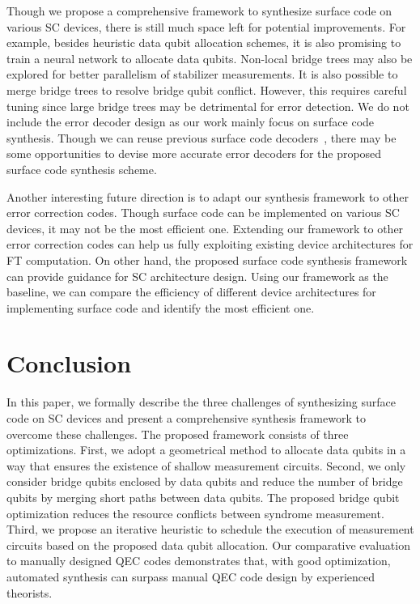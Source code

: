 Though we propose a comprehensive framework to synthesize surface code on various SC devices, there is still much space left for potential improvements. 
For example, besides heuristic data qubit allocation schemes, it is also promising to train a neural network to allocate data qubits.
Non-local bridge trees may also be explored for better parallelism of stabilizer measurements. 
It is also possible to merge bridge trees to resolve bridge qubit conflict. However, this requires careful tuning since large bridge trees may be detrimental for error detection.
We do not include the error decoder design as our work mainly focus on surface code synthesis. Though we can reuse previous surface code decoders~\cite{Chamberland2020TopologicalAS, Varsamopoulos2017DecodingSS, Krastanov2017DeepNN, Baireuther2017MachinelearningassistedCO}, there may be some opportunities to devise more accurate error decoders for the proposed surface code synthesis scheme.

Another interesting future direction is to adapt our synthesis framework to other error correction codes. Though surface code can be implemented on various SC devices, it may not be the most efficient one. Extending our framework to other error correction codes can help us fully exploiting existing device architectures for FT computation.
On other hand, the proposed surface code synthesis framework can provide guidance for SC architecture design. Using our framework as the baseline, we can compare the efficiency of different device architectures for implementing surface code and identify the most efficient one.

\section{Conclusion}
In this paper, we formally describe the three challenges of synthesizing surface code on SC devices and present a comprehensive synthesis framework to overcome these challenges. The proposed framework consists of three optimizations.
First, we adopt a geometrical method to allocate data qubits in a way that ensures the existence of shallow measurement circuits. 
Second, we only consider bridge qubits enclosed by data qubits and reduce the number of bridge qubits by merging short paths between data qubits. The proposed bridge qubit optimization reduces the resource conflicts between syndrome measurement. 
Third, we propose an iterative heuristic to schedule the execution of measurement circuits based on the proposed data qubit allocation. %
Our comparative evaluation to manually designed QEC codes demonstrates that, with good optimization, automated synthesis can surpass manual QEC code design by experienced theorists.

